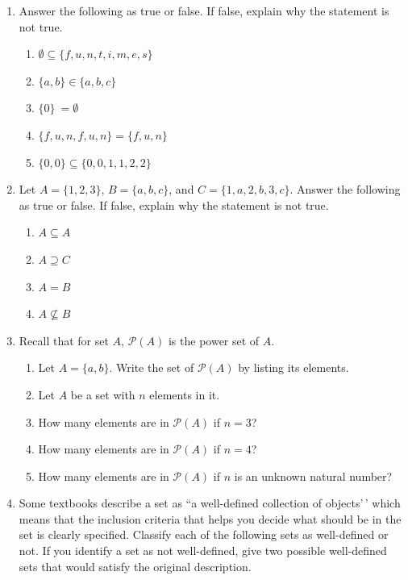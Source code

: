 \documentclass[
]{book}
\theoremstyle{definition}
\theoremstyle{definition}
\theoremstyle{definition}
\theoremstyle{definition}
\theoremstyle{remark}
\begin{document}
\begin{enumerate}
\def\labelenumi{\arabic{enumi}.}
\item
  Answer the following as true or false. If false, explain why the statement is not true.

  \begin{enumerate}
  \def\labelenumii{\alph{enumii}.}
  \item
    \(\emptyset \subseteq \{f,u,n,t,i,m,e,s\}\)
  \item
    \(\{a,b\} \in \{a,b,c\}\)
  \item
    \(\{0 \}\ = \emptyset\)
  \item
    \(\{f,u,n,f,u,n \}=\{f,u,n \}\)
  \item
    \(\{0,0\} \subseteq \{0,0,1,1,2,2\}\)
  \end{enumerate}
\item
  Let \(A=\{1, 2, 3\}\), \(B=\{a, b, c\}\), and \(C=\{1, a, 2, b, 3, c\}\). Answer the following as true or false. If false, explain why the statement is not true.

  \begin{enumerate}
  \def\labelenumii{\alph{enumii}.}
  \item
    \(A \subseteq A\)
  \item
    \(A\supseteq C\)
  \item
    \(A=B\)
  \item
    \(A \nsubseteq B\)
  \end{enumerate}
\item
  Recall that for set \(A\), \(\mathcal{P}(A)\) is the power set of \(A\).

  \begin{enumerate}
  \def\labelenumii{\alph{enumii}.}
  \item
    Let \(A=\{a,b\}\). Write the set of \(\mathcal{P}(A)\) by listing its elements.
  \item
    Let \(A\) be a set with \(n\) elements in it.
  \item
    How many elements are in \(\mathcal{P}(A)\) if \(n=3\)?
  \item
    How many elements are in \(\mathcal{P}(A)\) if \(n=4\)?
  \item
    How many elements are in \(\mathcal{P}(A)\) if \(n\) is an unknown natural number?
  \end{enumerate}
\item
  Some textbooks describe a set as ``a well-defined collection of objects'\,' which means that the inclusion criteria that helps you decide what should be in the set is clearly specified. Classify each of the following sets as well-defined or not. If you identify a set as not well-defined, give two possible well-defined sets that would satisfy the original description.


\end{enumerate}
\end{document}
